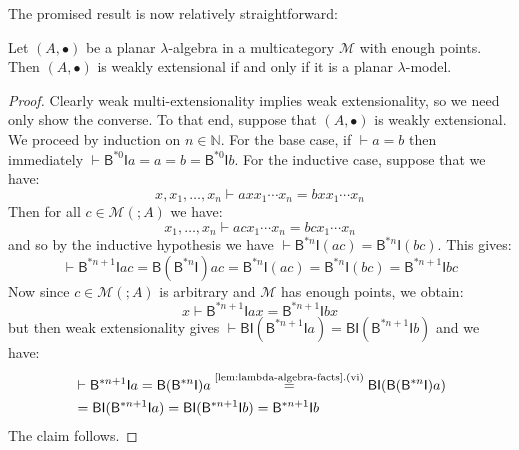 \documentclass{llncs}
\begin{document}
The promised result is now relatively straightforward:
\begin{lemma}
  Let $(A,\bullet)$ be a planar $\lambda$-algebra in a multicategory $\mathcal{M}$ with enough points. Then $(A,\bullet)$ is weakly extensional if and only if it is a planar $\lambda$-model.
\end{lemma}
\begin{proof}
  Clearly weak multi-extensionality implies weak extensionality, so we need only show the converse. To that end, suppose that $(A,\bullet)$ is weakly extensional. We proceed by induction on $n \in \mathbb{N}$. For the base case, if $\vdash a = b$ then immediately $\vdash \mathsf{B}^{*0}\mathsf{I}a = a = b = \mathsf{B}^{*0}\mathsf{I}b$. For the inductive case, suppose that we have:
  \[
    x,x_1,\ldots,x_n \vdash axx_1 \cdots x_n = bxx_1 \cdots x_n
  \]
  Then for all $c \in \mathcal{M}(;A)$ we have:
  \[
    x_1,\ldots,x_n \vdash acx_1 \cdots x_n = bcx_1 \cdots x_n
  \]
  and so by the inductive hypothesis we have $\vdash \mathsf{B}^{*n}\mathsf{I}(ac) = \mathsf{B}^{*n}\mathsf{I}(bc)$. This gives:
  \[
    \vdash \mathsf{B}^{*n+1}\mathsf{I}ac = \mathsf{B}(\mathsf{B}^{*n}\mathsf{I})ac = \mathsf{B}^{*n}\mathsf{I}(ac) = \mathsf{B}^{*n}\mathsf{I}(bc) = \mathsf{B}^{*n+1}\mathsf{I}bc
  \]
  Now since $c \in \mathcal{M}(;A)$ is arbitrary and $\mathcal{M}$ has enough points, we obtain:
  \[
    x \vdash \mathsf{B}^{*n+1}\mathsf{I}ax = \mathsf{B}^{*n+1}\mathsf{I}bx
  \]
  but then weak extensionality gives $\vdash \mathsf{BI}(\mathsf{B}^{*n+1}\mathsf{I}a) = \mathsf{BI}(\mathsf{B}^{*n+1}\mathsf{I}b)$ and we have: 
  \begin{align*}
    & \vdash \mathsf{B}^{*n+1}\mathsf{I}a
      = \mathsf{B}(\mathsf{B}^{*n}\mathsf{I})a
      \overset{\text{\ref{lem:lambda-algebra-facts}.(vi)}}{=} \mathsf{BI}(\mathsf{B}(\mathsf{B}^{*n}\mathsf{I})a)
      \\&= \mathsf{BI}(\mathsf{B}^{*n+1}\mathsf{I}a)
      = \mathsf{BI}(\mathsf{B}^{*n+1}\mathsf{I}b)
      = \mathsf{B}^{*n+1}\mathsf{I}b
  \end{align*}
  The claim follows.
\end{proof}
  
\end{document}
